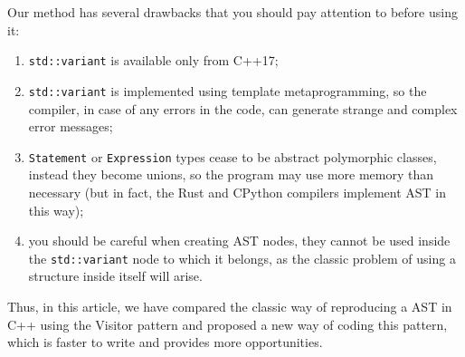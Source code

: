 \documentclass[a4paper, 12pt]{article}
\begin{document}
	Our method has several drawbacks that you should pay attention to before using it:
	\begin{enumerate}
		\item 
			\texttt{std::variant} is available only from C++17;
		\item
			\texttt{std::variant} is implemented using template metaprogramming, so the compiler, in case of any errors in the code, can generate strange and complex error messages;
		\item
			\texttt{Statement} or \texttt{Expression} types cease to be abstract polymorphic classes, instead they become unions, so the program may use more memory than necessary (but in fact, the Rust and CPython compilers implement AST in this way);
		\item
			you should be careful when creating AST nodes, they cannot be used inside the \texttt{std::variant} node to which it belongs, as the classic problem of using a structure inside itself will arise.
	\end{enumerate}

	Thus, in this article, we have compared the classic way of reproducing a AST in C++ using the Visitor pattern and proposed a new way of coding this pattern, which is faster to write and provides more opportunities.
	
	
	
\end{document}
